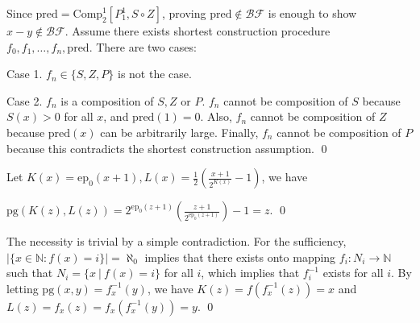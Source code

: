 \documentclass[11pt]{article}
\begin{document}
\begin{pf} \rm
Since $\mathrm{pred} = \mathrm{Comp}^1_2[P_1^1, S\circ Z]$, proving $\mathrm{pred}\notin
\mathcal{BF}$ is enough to show $x-y\notin\mathcal{BF}$.
Assume there exists shortest construction procedure
$f_0, f_1, \ldots, f_n, \mathrm{pred}$. There are two cases:

Case 1. $f_n\in\{S,Z,P\}$ is not the case.

Case 2. $f_n$ is a composition of $S,Z$ or $P$. $f_n$ cannot be composition of $S$ because
$S(x)>0$ for all $x$, and $\mathrm{pred}(1)=0$. Also, $f_n$ cannot be composition of 
$Z$ because $\mathrm{pred}(x)$
can be arbitrarily large. Finally, $f_n$ cannot be composition of $P$ because this contradicts
the shortest construction assumption. \qed

\end{pf}


\begin{pf} \rm
 Let $\displaystyle K(x) = \mathrm{ep}_0 (x + 1), L(x) = 
\frac{1}{2} \left( \frac{x + 1}{2^{K(x)}} - 1 \right) $, we have
 
$\displaystyle \mathrm{pg}(K(z),L(z)) = 
2^{\mathrm{ep}_0(z+1)} \left( \frac{z + 1}{2^{\mathrm{ep}_0(z+1)}} \right) - 1
=z
$. \qed


\end{pf}


\begin{pf} \rm
 The necessity is trivial by a simple contradiction.
 For the sufficiency, $|\{x\in\mathbb{N} : f(x) = i\}|=\aleph_0$ implies that
 there exists onto mapping
 $f_i : N_i\to \mathbb{N}$ such that $N_i = \{x~ | ~f(x) = i\}$ for all $i$,
 which implies that $f_i^{-1}$ exists for all $i$.
 By letting $\mathrm{pg}(x, y) = f_x^{-1}(y)$,
 we have $K(z) = f(f_x^{-1}(z)) = x$ and $L(z) 
 = f_x(z) = f_x( f_x^{-1}(y) ) = y$. \qed

\end{pf}

\end{document}
